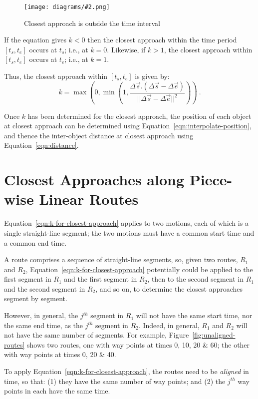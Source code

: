 \documentclass[times,12pt]{article}
\newcommand{\figh}[3][0.4]{
	\begin{figure}[tbp]
		\begin{center}
			\texttt{[image: diagrams/\#2.png]}%
		\end{center}
		\caption{#3}
		\label{fig:#2}
	\end{figure}
}
\begin{document}
\figh[0.2]{KGreaterThan1}{Closest approach is outside the time interval}

If the equation gives $k<0$ then the closest approach within the time period $[t_s, t_e]$ occurs at $t_s$; i.e., at $k=0$. Likewise, if $k>1$, the closest approach within $[t_s, t_e]$ occurs at $t_e$; i.e., at $k=1$.

Thus, the closest approach within $[t_s, t_e]$ is given by:
\begin{equation}
\label{eqn:k-for-closest-approach}
	k = \max\left(0, \min\left(1,
		\frac{\Delta{\vec{s}} . (\Delta{\vec{s}} - \Delta{\vec{e}})}
		{||\Delta{\vec{s}} - \Delta{\vec{e}} ||^2}\right)\right) \ .
\end{equation}

Once $k$ has been determined for the closest approach, the position of each object at closest approach can be determined using Equation~\ref{eqn:interpolate-position}, and thence the inter-object distance at closest approach using Equation~\ref{eqn:distance}.  

\section{Closest Approaches along Piece-wise Linear Routes}
Equation~\ref{eqn:k-for-closest-approach} applies to two motions, each of which is a single straight-line segment; the two motions must have a common start time and a common end time.

A route comprises a sequence of straight-line segments, so, given two routes, $R_1$ and $R_2$, Equation~\ref{eqn:k-for-closest-approach} potentially could be applied to the first segment in $R_1$ and the first segment in $R_2$, then to the second segment in $R_1$ and the second segment in $R_2$, and so on, to determine the closest approaches segment by segment.

However, in general, the $j^{th}$ segment in $R_1$ will not have the same start time, nor the same end time, as the $j^{th}$ segment in $R_2$. Indeed, in general, $R_1$ and $R_2$ will not have the same number of segments. For example, Figure~\ref{fig:unaligned-routes} shows two routes, one with way points at times 0, 10, 20 \& 60; the other with way points at times 0, 20 \& 40.

To apply Equation~\ref{eqn:k-for-closest-approach}, the routes need to be \textit{aligned} in time, so that: (1) they have the same number of way points; and (2) the $j^{th}$ way points in each have the same time.
\end{document}
